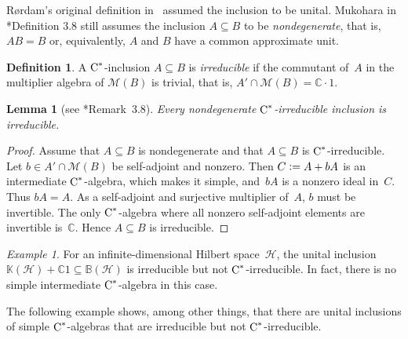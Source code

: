 \documentclass[a4paper]{amsart}
\theoremstyle{plain}
\newtheorem{lemma}[theorem]{Lemma}
\theoremstyle{definition}
\newtheorem{definition}[theorem]{Definition}
\theoremstyle{remark}
\newtheorem{example}[theorem]{Example}
\numberwithin{theorem}{section}
\numberwithin{equation}{section}
\newcommand*{\nb}{\nobreakdash}
\newcommand*{\C}{\mathbb C}
\newcommand*{\Bound}{\mathbb B}%
\newcommand*{\Comp}{\mathbb K}%
\newcommand*{\Cst}{\textup C^*}%
\newcommand*{\Mult}{\mathcal M}%
\newcommand*{\defeq}{\mathrel{\vcentcolon=}}%
\begin{document}
Rørdam's original definition in~\cite{Rordam:Irreducible_inclusions}
assumed the inclusion to be unital.
Mukohara in \cite{Mukohara:Inclusions}*{Definition 3.8} still assumes
the inclusion \(A\subseteq B\) to be \emph{nondegenerate}, that is,
\(AB=B\) or, equivalently, \(A\) and \(B\) have a common approximate
unit.

\begin{definition}
  A \(\Cst\)\nb-inclusion \(A\subseteq B\) is \emph{irreducible} if
  the commutant of~\(A\) in the multiplier algebra of \(\Mult(B)\) is
  trivial, that is, \(A' \cap \Mult(B) = \C\cdot 1\).
\end{definition}

\begin{lemma}[see \cite{Rordam:Irreducible_inclusions}*{Remark~3.8}]
  \label{C-irreducible_implies_irreducible}
  Every nondegenerate \(\Cst\)\nb-irreducible inclusion is irreducible.
\end{lemma}

\begin{proof}
  Assume that \(A\subseteq B\) is nondegenerate and that \(A\subseteq
  B\) is \(\Cst\)\nb-irreducible.
  Let \(b\in A' \cap \Mult(B)\) be self-adjoint and nonzero.
  Then \(C\defeq A+ bA\) is an intermediate \(\Cst\)\nb-algebra, which
  makes it simple, and~\(bA\) is a nonzero ideal in~\(C\).
  Thus \(bA=A\).
  As a self-adjoint and surjective multiplier of~\(A\), \(b\) must be
  invertible.
  The only \(\Cst\)\nb-algebra where all nonzero self-adjoint elements are
  invertible is~\(\C\).
  Hence \(A\subseteq B\) is irreducible.
\end{proof}

\begin{example}
  For an infinite-dimensional Hilbert space~\(\mathcal{H}\), the
  unital inclusion
  \(\Comp(\mathcal{H})+\C 1\subseteq \Bound(\mathcal{H})\) is
  irreducible but not \(\Cst\)\nb-irreducible.  In fact, there is no
  simple intermediate \(\Cst\)\nb-algebra in this case.
\end{example}

The following example shows, among other things, that there are unital
inclusions of simple \(\Cst\)\nb-algebras that are irreducible but not
\(\Cst\)\nb-irreducible.
\end{document}
